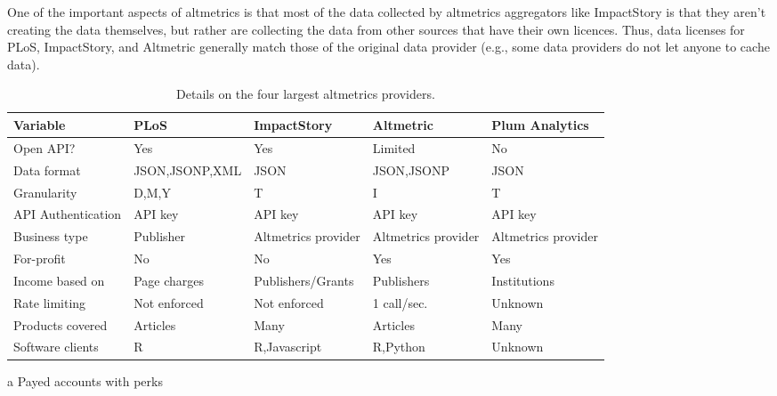 \documentclass[letterpaper,superscriptaddress,showkeys,longbibliography]{revtex4-1}\usepackage{graphicx, color}
\begin{document}
One of the important aspects of altmetrics is that most of the data collected by altmetrics aggregators like ImpactStory is that they aren't creating the data themselves, but rather are collecting the data from other sources that have their own licences. Thus, data licenses for PLoS, ImpactStory, and Altmetric generally match those of the original data provider (e.g., some data providers do not let anyone to cache data). 


\begin{table}[!ht]
    \begin{threeparttable}[b]
    \caption{Details on the four largest altmetrics providers.}\label{tab:a} %
        \begin{tabular}{|l|l|l|l|l|}
            \hline
            Variable & PLoS & ImpactStory & Altmetric & Plum Analytics \\
            \hline
            Open API? & Yes & Yes & Limited\tnote{d} & No \\
            Data format & JSON,JSONP,XML & JSON & JSON,JSONP & JSON \\
            Granularity\tnote{b} & D,M,Y & T & I & T \\
            API Authentication & API key & API key & API key & API key \\
            Business type & Publisher & Altmetrics provider & Altmetrics provider & Altmetrics provider \\
            For-profit & No & No & Yes & Yes \\
            Income based on & Page charges & Publishers/Grants & Publishers & Institutions \\
            Rate limiting & Not enforced & Not enforced\tnote{c} & 1 call/sec.\tnote{d} & Unknown \\
            Products covered & Articles & Many\tnote{e} & Articles & Many\tnote{f} \\
            Software clients & R\tnote{g} & R,Javascript\tnote{h} & R,Python\tnote{i} & Unknown \\
            \hline
        \end{tabular}
        \begin{tablenotes}
            \item[a] Payed accounts with perks

\end{tablenotes}
\end{threeparttable}
\end{table}
\end{document}
